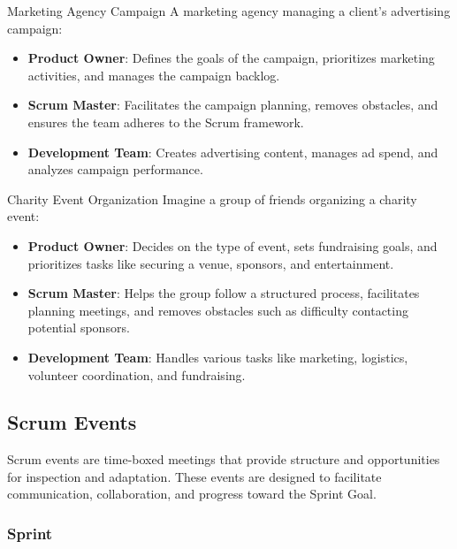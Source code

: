 \begin{examplecard}{Marketing Agency Campaign}
  A marketing agency managing a client's advertising campaign:
  \begin{itemize}
    \item \textbf{Product Owner}: Defines the goals of the campaign, prioritizes marketing activities, and manages the campaign backlog.
    \item \textbf{Scrum Master}: Facilitates the campaign planning, removes obstacles, and ensures the team adheres to the Scrum framework.
    \item \textbf{Development Team}: Creates advertising content, manages ad spend, and analyzes campaign performance.
  \end{itemize}
\end{examplecard}

\begin{examplecard}{Charity Event Organization}
  Imagine a group of friends organizing a charity event:
  \begin{itemize}
    \item \textbf{Product Owner}: Decides on the type of event, sets fundraising goals, and prioritizes tasks like securing a venue, sponsors, and entertainment.
    \item \textbf{Scrum Master}: Helps the group follow a structured process, facilitates planning meetings, and removes obstacles such as difficulty contacting potential sponsors.
    \item \textbf{Development Team}: Handles various tasks like marketing, logistics, volunteer coordination, and fundraising.
  \end{itemize}
\end{examplecard}

\subsection{Scrum Events}

Scrum events are time-boxed meetings that provide structure and opportunities
for inspection and adaptation. These events are designed to facilitate
communication, collaboration, and progress toward the Sprint Goal.


\subsubsection{Sprint}

